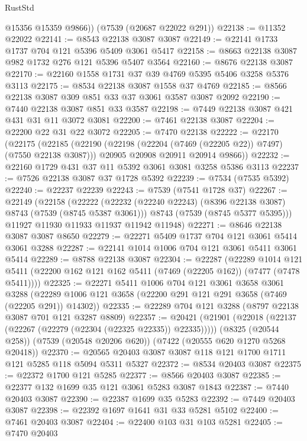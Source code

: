 \begin{lexlean}{RustStd}
\begin{coremodule}
        @15356
        @15359
        @9866))
    (@7539 (@20687 @22022 @291))
@22138 := @11352 @22022
@22141 := @8543 @22138 @3087 @3087
@22149 := @22141 @1733 @1737 @704 @121 @5396 @5409 @3061 @5417
@22158 := @8663 @22138 @3087 @982 @1732 @276 @121 @5396 @5407 @3564
@22160 := @8676 @22138 @3087
@22170 := @22160 @1558 @1731 @37 @39 @4769 @5395 @5406 @3258 @5376 @3113
@22175 := @8534 @22138 @3087 @1558 @37 @4769
@22185 := @8566 @22138 @3087 @309 @851 @33 @37 @3061 @3587 @3087 @2092
@22190 := @7440 @22138 @3087 @851 @33 @3587
@22198 := @7449 @22138 @3087 @421 @431 @31 @11 @3072 @3081
@22200 := @7461 @22138 @3087
@22204 := @22200 @22 @31 @22 @3072
@22205 := @7470 @22138
@22222 := @22170
    (@22175
      (@22185
        (@22190 (@22198 (@22204 (@7469 (@22205 @22)) @7497) (@7550 @22138 @3087)))
        @20905
        @20908
        @20911
        @20914
        @9866))
@22232 := @22160 @1729 @431 @37 @11 @5392 @3061 @3081 @3258 @5386 @3113
@22237 := @7526 @22138 @3087 @37 @1728 @5392
@22239 := @7534 (@7535 @5392)
@22240 := @22237 @22239
@22243 := @7539 (@7541 @1728 @37)
@22267 := @22149
    (@22158
      (@22222
        (@22232 (@22240 @22243) (@8396 @22138 @3087) @8743 (@7539 (@8745 @5387 @3061)))
        @8743
        (@7539 (@8745 @5377 @5395)))
      @11927
      @11930
      @11933
      @11937
      @11942
      @11948)
@22271 := @8646 @22138 @3087 @3087 @8650
@22279 := @22271 @5409 @1737 @704 @121 @3061 @5414 @3061 @3288
@22287 := @22141 @1014 @1006 @704 @121 @3061 @5411 @3061 @5414
@22289 := @8788 @22138 @3087
@22304 := @22287
    (@22289
      @1014
      @121
      @5411
      (@22200 @162 @121 @162 @5411 (@7469 (@22205 @162)) (@7477 (@7478 @5411))))
@22325 := @22271
    @5411
    @1006
    @704
    @121
    @3061
    @3658
    @3061
    @3288
    (@22289 @1006 @121 @3658 (@22200 @291 @121 @291 @3658 (@7469 (@22205 @291)) @14302))
@22335 := @22289 @704 @121 @3288 (@8797 @22138 @3087 @701 @121 @3287 @8809)
@22357 := @20421
    (@21901 (@22018 (@22137 (@22267 (@22279 (@22304 (@22325 @22335)) @22335)))))
    (@8325 (@20544 @258))
    (@7539 (@20548 @20206 @620))
    (@7422 (@20555 @620 @1270 @5268 @20418))
@22370 := @20565 @20403 @3087 @3087 @118 @121 @1700 @1711 @121 @5285 @118 @5094 @5311 @5327
@22372 := @8534 @20403 @3087
@22375 := @22372 @1700 @121 @5285
@22377 := @8566 @20403 @3087
@22385 := @22377 @132 @1699 @35 @121 @3061 @5283 @3087 @1843
@22387 := @7440 @20403 @3087
@22390 := @22387 @1699 @35 @5283
@22392 := @7449 @20403 @3087
@22398 := @22392 @1697 @1641 @31 @33 @5281 @5102
@22400 := @7461 @20403 @3087
@22404 := @22400 @103 @31 @103 @5281
@22405 := @7470 @20403

\end{coremodule}
\end{lexlean}
